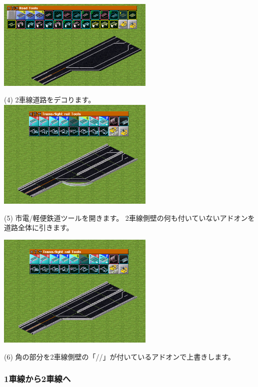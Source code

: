 \documentclass{jarticle}
\begin{document}
\begin{multicols}{2}
\includegraphics[width = 75mm]{picture/20210214-road-3-4.png}

(4)
2車線道路をデコります。\\



\includegraphics[width = 75mm]{picture/20210214-road-3-5.png}

(5)
市電/軽便鉄道ツールを開きます。
2車線側壁の何も付いていないアドオンを道路全体に引きます。



\includegraphics[width = 75mm]{picture/20210214-road-3-6.png}

(6)
角の部分を2車線側壁の「//」が付いているアドオンで上書きします。

\end{multicols}

\newpage


\subsubsection{1車線から2車線へ}
\label{sub:1lane_to_2lane}
\end{document}
